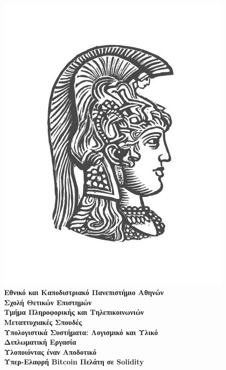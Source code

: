 \
\vspace{1.5cm}

\begin{center}
    {\includegraphics[scale=0.8]{figures/logo_uoa.jpg}}\\
    {\Large \textbf{Εθνικό και Καποδιστριακό Πανεπιστήμιο Αθηνών}} \\
    {\large \textbf{Σχολή Θετικών Επιστημών}} \\
    {\large \textbf{Τμήμα Πληροφορικής και Τηλεπικοινωνιών}}\\
    \vspace{1cm}
    {\large \textbf{Μεταπτυχιακές Σπουδές}} \\
    {\large \textbf{Υπολογιστικά Συστήματα: Λογισμικό και Υλικό}}\\
    \vspace{5mm}
    {\Large \textbf{Διπλωματική Εργασία}}\\
    \vspace{0.8cm}
    {\textbf{\LARGE Υλοποιόντας έναν Αποδοτικό\\ Υπερ-Ελαφρή Bitcoin Πελάτη σε Solidity}}\\
    \vspace{1.5cm}



\end{center}
